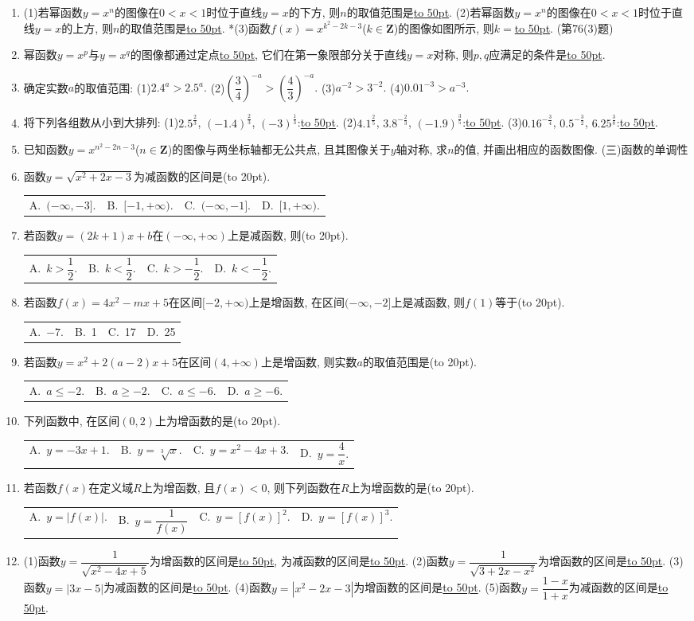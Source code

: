 \documentclass[10pt,a4paper]{article}
\newcommand{\blank}[1]{\underline{\hbox to #1pt{}}}
\newcommand{\bracket}[1]{(\hbox to #1pt{})}
\newcommand{\fourch}[4]{\par\begin{tabular}{p{.23\textwidth}p{.23\textwidth}p{.23\textwidth}p{.23\textwidth}}
A.~#1 &B.~#2& C.~#3& D.~#4
\end{tabular}}
\begin{document}
\begin{enumerate}[1.]
\item (1)若幂函数$y=x^n$的图像在$0<x<1$时位于直线$y=x$的下方, 则$n$的取值范围是\blank{50}.
(2)若幂函数$y=x^n$的图像在$0<x<1$时位于直线$y=x$的上方, 则$n$的取值范围是\blank{50}.
*(3)函数$f(x)=x^{k^2-2k-3}$($k\in \mathbf{Z}$)的图像如图所示, 则$k=$\blank{50}.
(第76(3)题)
\item 幂函数$y=x^p$与$y=x^q$的图像都通过定点\blank{50}, 它们在第一象限部分关于直线$y=x$对称, 则$p,q$应满足的条件是\blank{50}.
\item 确定实数$a$的取值范围:
(1)$2.4^a>2.5^a.$				(2)$(\dfrac 34)^{-a}>(\dfrac 43)^{-a}.$
(3)$a^{-2}>3^{-2}.$				(4)$0.01^{-3}>a^{-3}.$
\item 将下列各组数从小到大排列:
(1)$2.5^{\frac 23}$, $(-1.4)^{\frac 23}$, $(-3)^{\frac 13}$:\blank{50}.
(2)$4.1^{\frac 25}$, $3.8^{-\frac 23}$, $(-1.9)^{\frac 35}$:\blank{50}.
(3)$0.16^{-\frac 34}$, $0.5^{-\frac 32}$, $6.25^{\frac 38}$:\blank{50}.
\item 已知函数$y=x^{n^2-2n-3}$($n\in \mathbf{Z}$)的图像与两坐标轴都无公共点, 且其图像关于$y$轴对称, 求$n$的值, 并画出相应的函数图像.
(三)函数的单调性
\item 函数$y=\sqrt {x^2+2x-3}$为减函数的区间是\bracket{20}.
\fourch{$(-\infty ,-3 ].$}{$[ -1,+\infty).$}{$(-\infty ,-1 ].$}{$[ 1,+\infty).$}
\item 若函数$y=(2k+1)x+b$在$(-\infty ,+\infty)$上是减函数, 则\bracket{20}.
\fourch{$k>\dfrac 12.$}{$k<\dfrac 12.$}{$k>-\dfrac 12.$}{$k<-\dfrac 12.$}
\item 若函数$f(x)=4x^2-mx+5$在区间$[ -2,+\infty)$上是增函数, 在区间$(-\infty ,-2 ]$上是减函数, 则$f(1)$等于\bracket{20}.
\fourch{$-7.$}{1}{17}{25}
\item 若函数$y=x^2+2(a-2)x+5$在区间$(4,+\infty)$上是增函数, 则实数$a$的取值范围是\bracket{20}.
\fourch{$a\le -2.$}{$a\ge -2.$}{$a\le -6.$}{$a\ge -6.$}
\item 下列函数中, 在区间$(0,2)$上为增函数的是\bracket{20}.
\fourch{$y=-3x+1.$}{$y=\sqrt[3]x.$}{$y=x^2-4x+3.$}{$y=\dfrac 4x.$}
\item 若函数$f(x)$在定义域$R$上为增函数, 且$f(x)<0$, 则下列函数在$R$上为增函数的是\bracket{20}.
\fourch{$y=|f(x)|.$}{$y=\dfrac 1{f(x)}$}{$y=[ f(x) ]^2.$}{$y=[ f(x) ]^3.$}
\item (1)函数$y=\dfrac 1{\sqrt {x^2-4x+5}}$为增函数的区间是\blank{50}, 为减函数的区间是\blank{50}.
(2)函数$y=\dfrac 1{\sqrt {3+2x-x^2}}$为增函数的区间是\blank{50}.
(3)函数$y=|3x-5|$为减函数的区间是\blank{50}.
(4)函数$y=|x^2-2x-3|$为增函数的区间是\blank{50}.
(5)函数$y=\dfrac{1-x}{1+x}$为减函数的区间是\blank{50}.

\end{enumerate}
\end{document}
